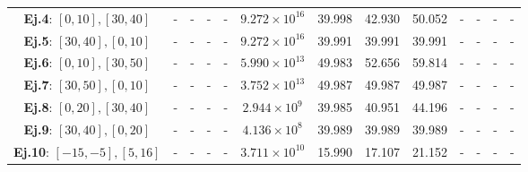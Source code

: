 \begin{table}
\begin{tabular}{|c|cccc|cccc|cccc|}
		\textbf{Ej.4}: $[0,10], [30,40]$           & -                                             & -                                                & -                                   & -        & $9.272\times10^{16}$ & 39.998         & 42.930                  & 50.052   & -                    & -              & -                       & -        \\
		\textbf{Ej.5}: $[30,40], [0,10]$           & -                                             & -                                                & -                                   & -        & $9.272\times10^{16}$ & 39.991         & 39.991                  & 39.991   & -                    & -              & -                       & -        \\
		\textbf{Ej.6}: $[0,10], [30,50]$           & -                                             & -                                                & -                                   & -        & $5.990\times10^{13}$ & 49.983         & 52.656                  & 59.814   & -                    & -              & -                       & -        \\
		\textbf{Ej.7}: $[30,50], [0,10]$           & -                                             & -                                                & -                                   & -        & $3.752\times10^{13}$ & 49.987         & 49.987                  & 49.987   & -                    & -              & -                       & -        \\
		\textbf{Ej.8}: $[0,20], [30,40]$           & -                                             & -                                                & -                                   & -        & $2.944\times10^{9}$  & 39.985         & 40.951                  & 44.196   & -                    & -              & -                       & -        \\
		\textbf{Ej.9}: $[30,40], [0,20]$           & -                                             & -                                                & -                                   & -        & $4.136\times10^{8}$  & 39.989         & 39.989                  & 39.989   & -                    & -              & -                       & -        \\
		\textbf{Ej.10}: $[-15,-5], [5,16]$         & -                                             & -                                                & -                                   & -        & $3.711\times10^{10}$ & 15.990         & 17.107                  & 21.152   & -                    & -              & -                       & -        \\

\end{tabular}
\end{table}
